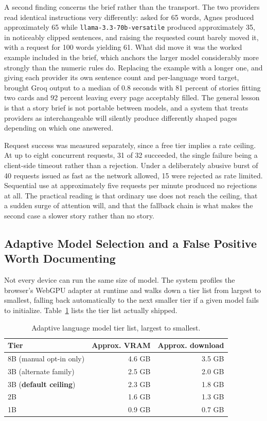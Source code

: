 \documentclass[conference]{IEEEtran}
\begin{document}
A second finding concerns the brief rather than the transport. The two providers read identical instructions very differently: asked for 65 words, Agnes produced approximately 65 while \texttt{llama-3.3-70b-versatile} produced approximately 35, in noticeably clipped sentences, and raising the requested count barely moved it, with a request for 100 words yielding 61. What did move it was the worked example included in the brief, which anchors the larger model considerably more strongly than the numeric rules do. Replacing the example with a longer one, and giving each provider its own sentence count and per-language word target, brought Groq output to a median of 0.8 seconds with 81 percent of stories fitting two cards and 92 percent leaving every page acceptably filled. The general lesson is that a story brief is not portable between models, and a system that treats providers as interchangeable will silently produce differently shaped pages depending on which one answered.

Request success was measured separately, since a free tier implies a rate ceiling. At up to eight concurrent requests, 31 of 32 succeeded, the single failure being a client-side timeout rather than a rejection. Under a deliberately abusive burst of 40 requests issued as fast as the network allowed, 15 were rejected as rate limited. Sequential use at approximately five requests per minute produced no rejections at all. The practical reading is that ordinary use does not reach the ceiling, that a sudden surge of attention will, and that the fallback chain is what makes the second case a slower story rather than no story.

\subsection{Adaptive Model Selection and a False Positive Worth Documenting}

Not every device can run the same size of model. The system profiles the browser's WebGPU adapter at runtime and walks down a tier list from largest to smallest, falling back automatically to the next smaller tier if a given model fails to initialize. Table~\ref{tab:tiers} lists the tier list actually shipped.

\begin{table}[t]
\caption{Adaptive language model tier list, largest to smallest.}
\label{tab:tiers}
\centering
\begin{tabular}{lrr}
\toprule
Tier & Approx. VRAM & Approx. download \\
\midrule
8B (manual opt-in only) & 4.6 GB & 3.5 GB \\
3B (alternate family) & 2.5 GB & 2.0 GB \\
3B (\textbf{default ceiling}) & 2.3 GB & 1.8 GB \\
2B & 1.6 GB & 1.3 GB \\
1B & 0.9 GB & 0.7 GB \\
\bottomrule
\end{tabular}
\end{table}
\end{document}
